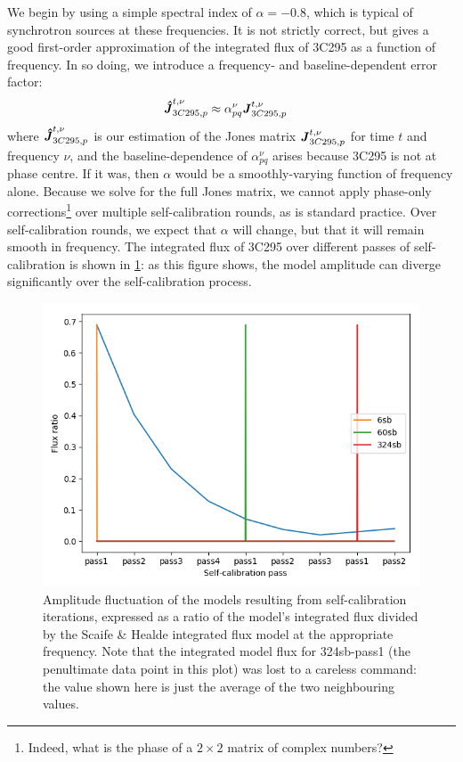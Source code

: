 \pg
We begin by using a simple spectral index of $\alpha=-0.8$, which is typical of synchrotron sources at these frequencies. It is not strictly correct, but gives a good first-order approximation of the integrated flux of 3C295 as a function of frequency. In so doing, we introduce a frequency- and baseline-dependent error factor:
\begin{align}
\textbf{\emph{\^{J}}}_{3C295,p}^{t,\nu} &\approx \alpha_{pq}^\nu \textbf{\emph{J}}_{3C295,p}^{t,\nu}
\end{align}
where $\textbf{\emph{\^{J}}}_{3C295,p}^{t,\nu}$ is our estimation of the Jones matrix $\textbf{\emph{J}}_{3C295,p}^{t,\nu}$ for time $t$ and frequency $\nu$, and the baseline-dependence of $\alpha_{pq}^\nu$ arises because 3C295 is not at phase centre. If it was, then $\alpha$ would be a smoothly-varying function of frequency alone.
Because we solve for the full Jones matrix, we cannot apply phase-only corrections\footnote{Indeed, what is the phase of a $2\times2$ matrix of complex numbers?} over multiple self-calibration rounds, as is standard practice. Over self-calibration rounds, we expect that $\alpha$ will change, but that it will remain smooth in frequency. The integrated flux of 3C295 over different passes of self-calibration is shown in \cref{fig.SC.ampfluct}: as this figure shows, the model amplitude can diverge significantly over the self-calibration process. %

\begin{figure}[h]
\includegraphics[width=0.8\linewidth]{images/AmpFluct.png}
\caption{\label{fig.SC.ampfluct} Amplitude fluctuation of the models resulting from self-calibration iterations, expressed as a ratio of the model's integrated flux divided by the Scaife \& Healde integrated flux model at the appropriate frequency. Note that the integrated model flux for 324sb-pass1 (the penultimate data point in this plot) was lost to a careless command: the value shown here is just the average of the two neighbouring values.}
\end{figure}

